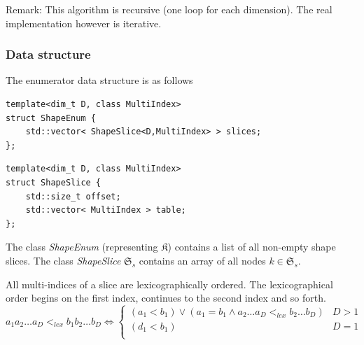 \documentclass{article}
\def\classname#1{\textit{#1}}
\begin{document}
Remark: This algorithm is recursive (one loop for each dimension).
The real implementation however is iterative.

\subsubsection{Data structure}

The enumerator data structure is as follows

\begin{verbatim}
template<dim_t D, class MultiIndex>
struct ShapeEnum {
    std::vector< ShapeSlice<D,MultiIndex> > slices;
};
\end{verbatim}

\begin{verbatim}
template<dim_t D, class MultiIndex>
struct ShapeSlice {
    std::size_t offset;
    std::vector< MultiIndex > table;
};
\end{verbatim}

The class \classname{ShapeEnum} (representing \(\mathfrak{K}\)) contains a list
of all non-empty shape slices. The class \classname{ShapeSlice}
\(\mathfrak{S}_s\) contains an array of all nodes \(k \in \mathfrak{S}_s\).

All multi-indices of a slice are lexicographically ordered.
The lexicographical order begins on the first index, continues to the second index and so forth.
\begin{equation}
  \label{eq:lexical_order}
  a_1a_2\dots a_D <_{lex}b_1b_2\dots b_D \iff 
  \begin{cases}
    (a_1 < b_1) \lor (a_1 = b_1 \land a_2\dots a_D <_{lex} b_2\dots b_D) & D > 1 \\
    (d_1 < b_1) & D = 1 \\
  \end{cases}
\end{equation}
\end{document}
